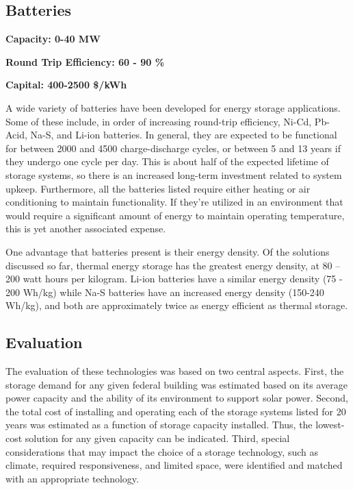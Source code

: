 \subsection{Batteries}
\textbf{Capacity: 0-40 MW}

\noindent\textbf{Round Trip Efficiency: 60 - 90 \%}

\noindent\textbf{Capital: 400-2500 \$/kWh}

A wide variety of batteries have been developed for energy storage
applications. Some of these include, in order of increasing round-trip
efficiency, Ni-Cd, Pb-Acid, Na-S, and Li-ion batteries. In general, they are
expected to be functional for between 2000 and 4500 charge-discharge cycles, or
between 5 and 13 years if they undergo one cycle per day. This is about half of
the expected lifetime of storage systems, so there is an increased long-term
investment related to system upkeep. Furthermore, all the batteries listed
require either heating or air conditioning to maintain functionality. If
they’re utilized in an environment that would require a significant amount of
energy to maintain operating temperature, this is yet another associated expense.

One advantage that batteries present is their energy density. Of the solutions
discussed so far, thermal energy storage has the greatest energy density, at 80
– 200 watt hours per kilogram. Li-ion batteries have a similar energy density
(75 - 200 Wh/kg) while Na-S batteries have an increased energy density (150-240
Wh/kg), and both are approximately twice as energy efficient as thermal
storage.

\subsection{Evaluation}

The evaluation of these technologies was based on two central aspects. First,
the storage demand for any given federal building was estimated based on its
average power capacity and the ability of its environment to support solar
power. Second, the total cost of installing and operating each of the storage
systems listed for 20 years was estimated as a function of storage capacity
installed. Thus, the lowest-cost solution for any given capacity can be
indicated. Third, special considerations that may impact the choice of a
storage technology, such as climate, required responsiveness, and limited
space, were identified and matched with an appropriate technology.

